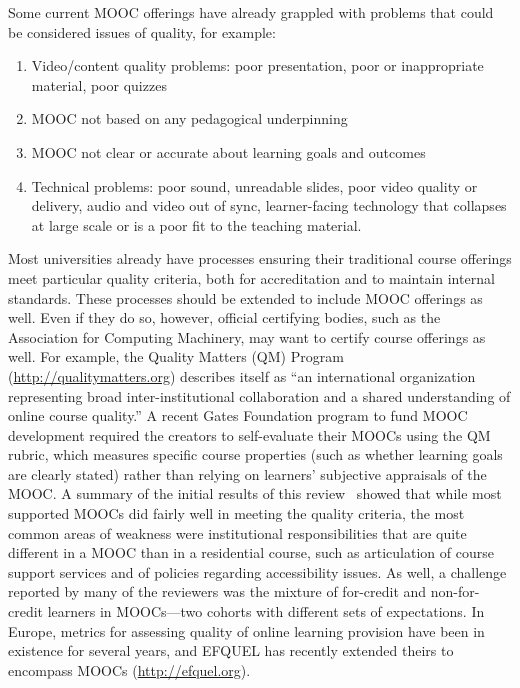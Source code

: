 Some current MOOC offerings have already grappled with problems that
could be considered issues of quality, for example:

\begin{enumerate}

\item Video/content quality problems: poor presentation, poor or inappropriate
material, poor quizzes

\item MOOC not based on any pedagogical
underpinning 

\item MOOC not clear or accurate about learning goals and
outcomes

\item Technical problems: poor sound, unreadable slides, poor
video quality or delivery, audio and video out of sync, learner-facing
technology that collapses at large scale or is a poor fit to the teaching material.

\end{enumerate}

Most universities already have processes ensuring their traditional
course offerings meet particular quality criteria, both for
accreditation and to maintain internal standards.
These processes should be extended to include MOOC offerings as well.
Even if they do so, however, official certifying bodies, such as the
Association for Computing Machinery, may want to certify course
offerings as well.
For example, the Quality Matters (QM) Program
(\url{http://qualitymatters.org}) describes itself as ``an
international organization representing broad inter-institutional
collaboration and a shared understanding of online course quality.''
A recent Gates Foundation program to fund MOOC development required
the creators to self-evaluate their MOOCs using the QM rubric, which
measures specific course properties (such as whether learning goals
are clearly stated) rather than relying on learners' subjective
appraisals of the MOOC.
A summary of the initial results of this
review~\cite{gates-qm-review-summary-2013} showed that while most
supported MOOCs did fairly well in meeting the quality criteria, the
most common areas of weakness were institutional responsibilities that
are quite different in a MOOC than in a residential course, such as
articulation of course support services and of policies regarding
accessibility issues.  As well, a challenge reported by many of the
reviewers was the mixture of for-credit and non-for-credit learners in
MOOCs---two cohorts with different sets of expectations.
In Europe, metrics for assessing quality of online learning provision have been in existence for
several years, and EFQUEL has recently extended theirs to encompass MOOCs (\url{http://efquel.org}).
